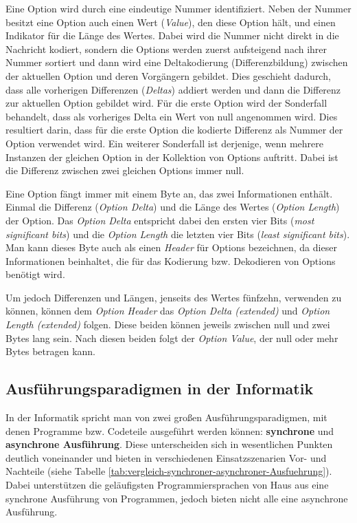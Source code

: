 Eine Option wird durch eine eindeutige Nummer identifiziert. Neben der Nummer besitzt eine Option auch einen Wert (\textit{Value}), den diese Option hält, und einen Indikator für die Länge des Wertes. Dabei wird die Nummer nicht direkt in die Nachricht kodiert, sondern die Options werden zuerst aufsteigend nach ihrer Nummer sortiert und dann wird eine Deltakodierung (Differenzbildung) zwischen der aktuellen Option und deren Vorgängern gebildet. Dies geschieht dadurch, dass alle vorherigen Differenzen (\textit{Deltas}) addiert werden und dann die Differenz zur aktuellen Option gebildet wird. Für die erste Option wird der Sonderfall behandelt, dass als vorheriges Delta ein Wert von null angenommen wird. Dies resultiert darin, dass für die erste Option die kodierte Differenz als Nummer der Option verwendet wird. Ein weiterer Sonderfall ist derjenige, wenn mehrere Instanzen der gleichen Option in der Kollektion von Options auftritt. Dabei ist die Differenz zwischen zwei gleichen Options immer null.

Eine Option fängt immer mit einem Byte an, das zwei Informationen enthält. Einmal die Differenz (\textit{Option Delta}) und die Länge des Wertes (\textit{Option Length}) der Option. Das \textit{Option Delta} entspricht dabei den ersten vier Bits (\textit{most significant bits}) und die \textit{Option Length} die letzten vier Bits (\textit{least significant bits}). Man kann dieses Byte auch als einen \textit{Header} für Options bezeichnen, da dieser Informationen beinhaltet, die für das Kodierung bzw. Dekodieren von Options benötigt wird.

Um jedoch Differenzen und Längen, jenseits des Wertes fünfzehn, verwenden zu können, können dem \textit{Option Header} das \textit{Option Delta (extended)} und \textit{Option Length (extended)} folgen. Diese beiden können jeweils zwischen null und zwei Bytes lang sein. Nach diesen beiden folgt der \textit{Option Value}, der null oder mehr Bytes betragen kann.

\subsection{Ausführungsparadigmen in der Informatik}
\label{subsubsec:ausfuehrungsparadigmen-in-der-informatik}

In der Informatik spricht man von zwei großen Ausführungsparadigmen, mit denen Programme bzw. Codeteile ausgeführt werden können: \textbf{synchrone} und \textbf{asynchrone Ausführung}. Diese unterscheiden sich in wesentlichen Punkten deutlich voneinander und bieten in verschiedenen Einsatzszenarien Vor- und Nachteile (siehe Tabelle \ref{tab:vergleich-synchroner-asynchroner-Ausfuehrung}). Dabei unterstützen die geläufigsten Programmiersprachen von Haus aus eine synchrone Ausführung von Programmen, jedoch bieten nicht alle eine asynchrone Ausführung.

